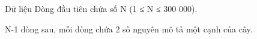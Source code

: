 Dữ liệu
Dòng đầu tiên chứa số N (1 ≤ N ≤ 300 000).  

   N-1 dòng sau, mỗi dòng chứa 2 số nguyên mô tả một cạnh   của cây.